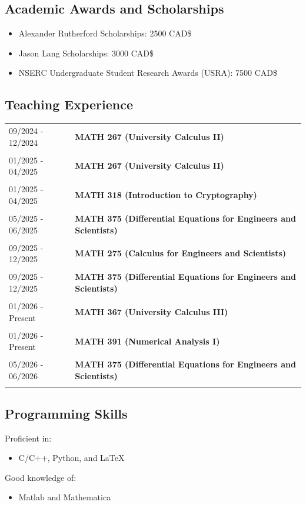\documentclass[12pt]{article}
\begin{document}
\subsection*{Academic Awards and Scholarships}
\begin{itemize}
	\item Alexander Rutherford Scholarships: 2500 CAD\$
	\item Jason Lang Scholarships: 3000 CAD\$
	\item NSERC Undergraduate Student Research Awards (USRA): 7500 CAD\$
\end{itemize}
\subsection*{Teaching Experience}
\begin{tabular}{l l}
09/2024 - 12/2024&\textbf{MATH 267 (University Calculus II)}\\
			&\\
01/2025 - 04/2025&\textbf{MATH 267 (University Calculus II)}\\
			&\\
01/2025 - 04/2025&\textbf{MATH 318 (Introduction to Cryptography)} \\
			&\\
05/2025 - 06/2025&\textbf{MATH 375 (Differential Equations for Engineers and Scientists)} \\
			&\\
09/2025 - 12/2025&\textbf{MATH 275 (Calculus for Engineers and Scientists)} \\
			&\\
09/2025 - 12/2025&\textbf{MATH 375 (Differential Equations for Engineers and Scientists)} \\
			&\\
01/2026 - Present&\textbf{MATH 367 (University Calculus III)} \\
			&\\
01/2026 - Present&\textbf{MATH 391 (Numerical Analysis I)} \\
			&\\
05/2026 - 06/2026&\textbf{MATH 375 (Differential Equations for Engineers and Scientists)} \\
			&\\
\end{tabular}
\subsection*{Programming Skills}
Proficient in:
\begin{itemize}
	\item C/C++, Python, and \LaTeX
\end{itemize}
Good knowledge of:
\begin{itemize}
	\item Matlab and Mathematica
\end{itemize}
\end{document}
